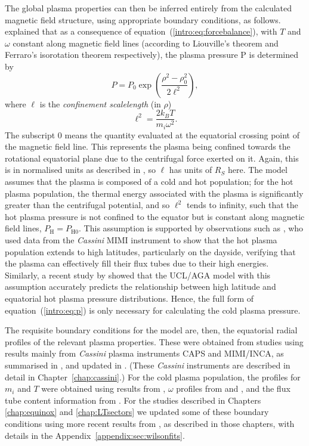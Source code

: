 The global plasma properties can then be inferred entirely from the calculated magnetic field structure, using appropriate boundary conditions, as follows. \citet{caudal1986} explained that as a consequence of equation~(\ref{intro:eq:forcebalance}), with $T$ and $\omega$ constant along magnetic field lines (according to Liouville's theorem and Ferraro's isorotation theorem respectively), the plasma pressure P is determined by 
\begin{equation}\label{intro:eq:p}
P = P_{0}\exp\left(\frac{\rho^2-\rho_0^2}{2\ell^2}\right),
\end{equation}
where $\ell$ is the \textit{confinement scalelength} (in $\rho$)
\begin{equation}
\ell^2 = \frac{2k_BT}{m_i\omega^2}.
\end{equation}
The subscript 0 means the quantity evaluated at the equatorial crossing point of the magnetic field line. This represents the plasma being confined towards the rotational equatorial plane due to the centrifugal force exerted on it. Again, this is in normalised units as described in \citet{achilleos2010a}, so $\ell$ has units of $\si{R_S}$ here. The model assumes that the plasma is composed of a cold and hot population; for the hot plasma population, the thermal energy associated with the plasma is significantly greater than the centrifugal potential, and so $\ell^2$ tends to infinity, such that the hot plasma pressure is not confined to the equator but is constant along magnetic field lines, $P_\mathrm{H} = P_\mathrm{H0}$. This assumption is supported by observations such as \citet{krimigis2007}, who used data from the \textit{Cassini} MIMI instrument to show that the hot plasma population extends to high latitudes, particularly on the dayside, verifying that the plasma can effectively fill their flux tubes due to their high energies. Similarly, a recent study by \citet{sergis2018} showed that the UCL/AGA model with this assumption accurately predicts the relationship between high latitude and equatorial hot plasma pressure distributions. Hence, the full form of equation~(\ref{intro:eq:p}) is only necessary for calculating the cold plasma pressure.

The requisite boundary conditions for the model are, then, the equatorial radial profiles of the relevant plasma properties. These were obtained from studies using results mainly from \textit{Cassini} plasma instruments CAPS and MIMI/INCA, as summarised in \citet{achilleos2010a}, and updated in \citet{achilleos2010b}. (These \textit{Cassini} instruments are described in detail in Chapter~\ref{chap:cassini}.) For the cold plasma population, the profiles for $m_i$ and $T$ were obtained using results from \citet{wilson2008}, $\omega$ profiles from \citet{wilson2008} and \citet{kane2008}, and the flux tube content information from \citet{mcandrews2009}. For the studies described in Chapters \ref{chap:equinox} and \ref{chap:LTsectors} we updated some of these boundary conditions using more recent results from \citet{wilson2017}, as described in those chapters, with details in the Appendix~\ref{appendix:sec:wilsonfits}.

